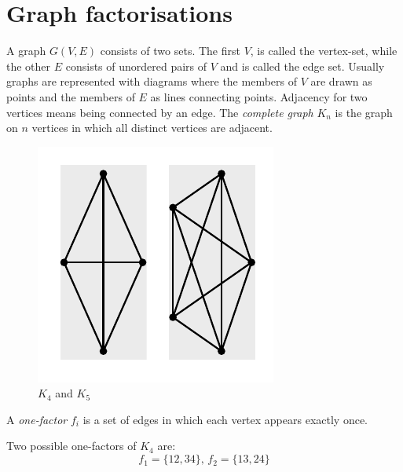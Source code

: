 \documentclass[11pt, a4paper]{book}\usepackage[]{graphicx}\usepackage[]{xcolor}
\makeatletter
\def\maxwidth{ %
  \ifdim\Gin@nat@width>\linewidth
    \linewidth
  \else
    \Gin@nat@width
  \fi
}
\newenvironment{knitrout}{}{} %
\newcounter{example}
\makeatother
\begin{document}
\section{Graph factorisations}

A graph $G(V,E)$ consists of two sets. The first $V$,
is called the vertex-set, while the other $E$ consists
of unordered pairs of $V$ and is called the edge set.
Usually graphs are represented with diagrams where the
members of $V$ are drawn as points and the members of
$E$ as lines connecting points. Adjacency for two vertices
means being connected by an edge. The
\emph{complete graph}
$K_n$ is the graph on $n$ vertices in which all distinct
vertices are adjacent.

\begin{knitrout}
\color{fgcolor}\begin{figure}

{\centering \includegraphics[width=\maxwidth]{figure/complete-graph-1} 

}

\caption[$K_4$ and $K_5$]{$K_4$ and $K_5$}\label{fig:complete-graph}
\end{figure}

\end{knitrout}

A
\emph{one-factor}
$f_i$ is a set of edges in which each vertex
appears exactly once.

\begin{example}
Two possible one-factors of $K_4$ are:
$$f_1 = \{12,34\},\, f_2 = \{13,24\}$$
\end{example}
\end{document}
